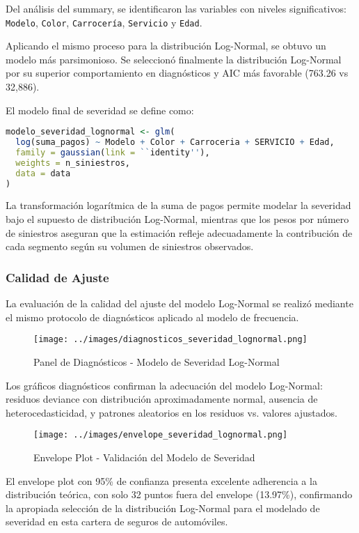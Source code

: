 Del análisis del summary, se identificaron las variables con niveles significativos: \texttt{Modelo}, \texttt{Color}, \texttt{Carrocería}, \texttt{Servicio} y \texttt{Edad}.

Aplicando el mismo proceso para la distribución Log-Normal, se obtuvo un modelo más parsimonioso. Se seleccionó finalmente la distribución Log-Normal por su superior comportamiento en diagnósticos y AIC más favorable (763.26 vs 32,886).

El modelo final de severidad se define como:

\begin{lstlisting}[language=R]
modelo_severidad_lognormal <- glm(
  log(suma_pagos) ~ Modelo + Color + Carroceria + SERVICIO + Edad,
  family = gaussian(link = ``identity''),
  weights = n_siniestros,
  data = data
)
\end{lstlisting}

La transformación logarítmica de la suma de pagos permite modelar la severidad bajo el supuesto de distribución Log-Normal, mientras que los pesos por número de siniestros aseguran que la estimación refleje adecuadamente la contribución de cada segmento según su volumen de siniestros observados.

\subsubsection{Calidad de Ajuste}

La evaluación de la calidad del ajuste del modelo Log-Normal se realizó mediante el mismo protocolo de diagnósticos aplicado al modelo de frecuencia.

\begin{figure}[H]
\centering
\texttt{[image: ../images/diagnosticos\_severidad\_lognormal.png]}
\caption{Panel de Diagnósticos - Modelo de Severidad Log-Normal}
\end{figure}

Los gráficos diagnósticos confirman la adecuación del modelo Log-Normal: residuos deviance con distribución aproximadamente normal, ausencia de heterocedasticidad, y patrones aleatorios en los residuos vs. valores ajustados.

\begin{figure}[H]
\centering
\texttt{[image: ../images/envelope\_severidad\_lognormal.png]}
\caption{Envelope Plot - Validación del Modelo de Severidad}
\end{figure}

El envelope plot con 95\% de confianza presenta excelente adherencia a la distribución teórica, con solo 32 puntos fuera del envelope (13.97\%), confirmando la apropiada selección de la distribución Log-Normal para el modelado de severidad en esta cartera de seguros de automóviles.